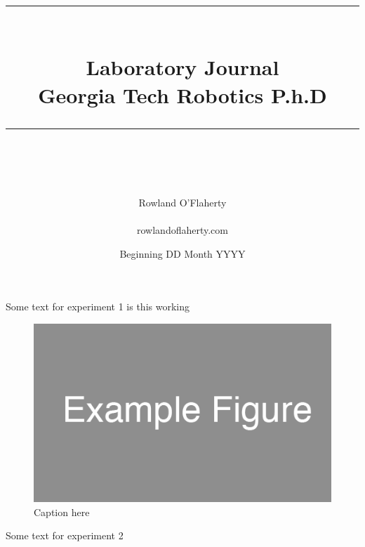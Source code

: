\documentclass[idxtotoc,hyperref,openany,oneside]{labbook} %
\newcommand{\HRule}{\rule{\linewidth}{0.5mm}} %
\begin{document}

\frontmatter %
\title{
\begin{center}
\HRule \\[0.4cm]
{\Huge \bfseries Laboratory Journal \\[0.5cm] \Large Georgia Tech Robotics P.h.D}\\[0.4cm] %
\HRule \\[1.5cm]
\end{center}
}
\author{\Huge Rowland O'Flaherty \\ \\ \LARGE rowlandoflaherty.com \\[2cm]}
\date{Beginning DD Month YYYY} %
\maketitle

\tableofcontents

\mainmatter %





Some text for experiment 1 is this working

\begin{figure}[H]
  \centering
  \includegraphics[]{Figs_2000_12_30/example_figure.png}
  \caption{Caption here}
  \label{fig:1}
\end{figure}



Some text for experiment 2


\end{document}
